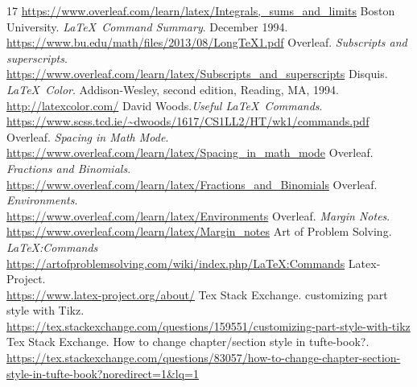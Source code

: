 \begin{thebibliography}{17}
			\url{https://www.overleaf.com/learn/latex/Integrals,_sums_and_limits}
		 Boston University. \textit{\LaTeX\ Command Summary}. December 1994.\\
			\url{https://www.bu.edu/math/files/2013/08/LongTeX1.pdf}
		 Overleaf. \textit{Subscripts and superscripts}.\\
			\url{https://www.overleaf.com/learn/latex/Subscripts_and_superscripts}
		 Disquis. \textit{\LaTeX\ Color}. Addison-Wesley, second edition, Reading, MA, 1994.\\
				\url{http://latexcolor.com/}
		 David Woods.\textit{Useful \LaTeX\ Commands}.\\
				\url{https://www.scss.tcd.ie/~dwoods/1617/CS1LL2/HT/wk1/commands.pdf}
		 Overleaf. \textit{Spacing in Math Mode}.\\
				\url{https://www.overleaf.com/learn/latex/Spacing_in_math_mode}
		 Overleaf. \textit{Fractions and Binomials}.\\
				\url{https://www.overleaf.com/learn/latex/Fractions_and_Binomials}
		 Overleaf. \textit{Environments}.\\
				\url{https://www.overleaf.com/learn/latex/Environments}
		 Overleaf. \textit{Margin Notes}.\\
				\url{https://www.overleaf.com/learn/latex/Margin_notes}
		 Art of Problem Solving. \textit{LaTeX:Commands}\\
				\url{https://artofproblemsolving.com/wiki/index.php/LaTeX:Commands}
		 Latex-Project.\\
				\url{https://www.latex-project.org/about/}
		 Tex Stack Exchange. customizing part style with Tikz.\\
				\url{https://tex.stackexchange.com/questions/159551/customizing-part-style-with-tikz}
			Tex Stack Exchange. How to change chapter/section style in tufte-book?.\\
				\url{https://tex.stackexchange.com/questions/83057/how-to-change-chapter-section-style-in-tufte-book?noredirect=1&lq=1}
	\end{thebibliography}
\addtocounter{section}{14}
